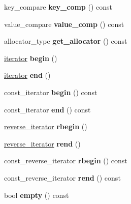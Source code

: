 \begin{DoxyCompactItemize}
\item 
\mbox{\label{classset_a03e8b552ede7aa381a5d29c5763d72fa}} 
key\+\_\+compare {\bfseries key\+\_\+comp} () const
\item 
\mbox{\label{classset_a1fcea9df55d79fc1071b24a8657cf6f2}} 
value\+\_\+compare {\bfseries value\+\_\+comp} () const
\item 
\mbox{\label{classset_ac06222c31892eff9ddf35842505a27eb}} 
allocator\+\_\+type {\bfseries get\+\_\+allocator} () const
\item 
\mbox{\label{classset_a77fa62d30f9ee20f2071cf4ac8ee8e10}} 
\hyperlink{structiterator}{iterator} {\bfseries begin} ()
\item 
\mbox{\label{classset_a660145e272ac05f1ce1444e2daee41b2}} 
\hyperlink{structiterator}{iterator} {\bfseries end} ()
\item 
\mbox{\label{classset_a55a15411df3dbc7d2c1ede2e0a991afd}} 
const\+\_\+iterator {\bfseries begin} () const
\item 
\mbox{\label{classset_a774dff86a4116d759df53fe108c4abf9}} 
const\+\_\+iterator {\bfseries end} () const
\item 
\mbox{\label{classset_ab80d0e4a02e70e3fd5ddd73a570c7ace}} 
\hyperlink{classreverse__iterator}{reverse\+\_\+iterator} {\bfseries rbegin} ()
\item 
\mbox{\label{classset_ae35f7dd4b826d2e92f1e0aead0395fd4}} 
\hyperlink{classreverse__iterator}{reverse\+\_\+iterator} {\bfseries rend} ()
\item 
\mbox{\label{classset_a97d56cabb8af06eedcbaed50c2d5fb83}} 
const\+\_\+reverse\+\_\+iterator {\bfseries rbegin} () const
\item 
\mbox{\label{classset_a557c42d15bd99f23ecc0724d4130fa92}} 
const\+\_\+reverse\+\_\+iterator {\bfseries rend} () const
\item 
\mbox{\label{classset_a5217530c478d26d81c0a72465e964bff}} 
bool {\bfseries empty} () const

\end{DoxyCompactItemize}
